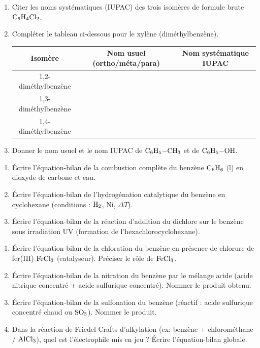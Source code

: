 \documentclass[11pt]{article}
\begin{document}
\begin{exercice}
\begin{enumerate}
    \item Citer les noms systématiques (IUPAC) des trois isomères de formule brute $\ce{C6H4Cl2}$.
    \item Compléter le tableau ci-dessous pour le xylène (diméthylbenzène).
    \begin{tabular}{|c|c|c|}
    \hline
    Isomère & Nom usuel (ortho/méta/para) & Nom systématique IUPAC \\
    \hline
    1,2-diméthylbenzène & & \\
    \hline
    1,3-diméthylbenzène & & \\
    \hline
    1,4-diméthylbenzène & & \\
    \hline
    \end{tabular}
    \item Donner le nom usuel et le nom IUPAC de $\ce{C6H5-CH3}$ et de $\ce{C6H5-OH}$.
\end{enumerate}
\end{exercice}

\begin{exercice}
\begin{enumerate}
    \item Écrire l'équation-bilan de la combustion complète du benzène $\ce{C6H6}$ (l) en dioxyde de carbone et eau.
    \item Écrire l'équation-bilan de l'hydrogénation catalytique du benzène en cyclohexane (conditions : $\ce{H2}$, Ni, $\Delta T$).
    \item Écrire l'équation-bilan de la réaction d'addition du dichlore sur le benzène sous irradiation UV (formation de l'hexachlorocyclohexane).
\end{enumerate}
\end{exercice}

\begin{exercice}
\begin{enumerate}
    \item Écrire l'équation-bilan de la chloration du benzène en présence de chlorure de fer(III) $\ce{FeCl3}$ (catalyseur). Préciser le rôle de $\ce{FeCl3}$.
    \item Écrire l'équation-bilan de la nitration du benzène par le mélange acide (acide nitrique concentré + acide sulfurique concentré). Nommer le produit obtenu.
    \item Écrire l'équation-bilan de la sulfonation du benzène (réactif : acide sulfurique concentré chaud ou $\ce{SO3}$). Nommer le produit.
    \item Dans la réaction de Friedel-Crafts d'alkylation (ex: benzène + chlorométhane / $\ce{AlCl3}$), quel est l'électrophile mis en jeu ? Écrire l'équation-bilan globale.
\end{enumerate}
\end{exercice}
\end{document}
